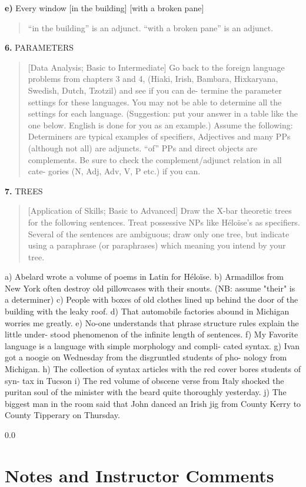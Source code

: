 \documentclass[11pt,notitlepage]{article}
\newcommand{\question}[2]{\textbf{#1.} #2}
\newcommand{\subquestion}[2]{\par\hspace{0.5cm} \textbf{#1)} #2}
\begin{document}
\subquestion{e}{Every window [in the building] [with a broken pane]}
\begin{quote}
  ``in the building'' is an adjunct. ``with a broken pane'' is an adjunct.
\end{quote}


\question{6}{PARAMETERS}
\begin{quote}[Data Analysis; Basic to Intermediate]
Go back to the foreign language problems from chapters 3 and 4,
(Hiaki, Irish, Bambara, Hixkaryana, Swedish, Dutch, Tzotzil) and see
if you can de- termine the parameter settings for these languages. You
may not be able to determine all the settings for each
language. (Suggestion: put your answer in a table like the one
below. English is done for you as an example.) Assume the following:
Determiners are typical examples of specifiers, Adjectives and many
PPs (although not all) are adjuncts. “of” PPs and direct objects are
complements. Be sure to check the complement/adjunct relation in all
cate- gories (N, Adj, Adv, V, P etc.) if you can.
\end{quote}

\question{7}{TREES}
\begin{quote}
[Application of Skills; Basic to Advanced]
Draw the X-bar theoretic trees for the following sentences. Treat
possessive NPs like Héloïse's as specifiers. Several of the sentences
are ambiguous; draw only one tree, but indicate using a paraphrase (or
paraphrases) which meaning you intend by your tree.
\end{quote}
a) Abelard wrote a volume of poems in Latin for Héloïse.
b) Armadillos from New York often destroy old pillowcases with their
snouts. (NB: assume "their" is a determiner)
c) People with boxes of old clothes lined up behind the door of the building
with the leaky roof.
d) That automobile factories abound in Michigan worries me greatly.
e) No-one understands that phrase structure rules explain the little under-
stood phenomenon of the infinite length of sentences.
f) My Favorite language is a language with simple morphology and compli-
cated syntax.
g) Ivan got a noogie on Wednesday from the disgruntled students of pho-
nology from Michigan.
h) The collection of syntax articles with the red cover bores students of syn-
tax in Tucson
i) The red volume of obscene verse from Italy shocked the puritan soul of
the minister with the beard quite thoroughly yesterday.
j) The biggest man in the room said that John danced an Irish jig from
County Kerry to County Tipperary on Thursday.

\newpage
  {\setlength{\baselineskip}%
           {0.0\baselineskip}
  \section*{Notes and Instructor Comments}
  \hrulefill \par}
\end{document}
